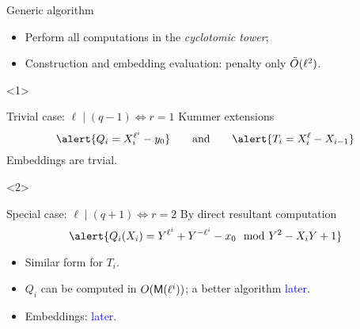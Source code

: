 \documentclass[12pt]{beamer}
\begin{document}

\begin{frame}
  \frametitle{\insertsection }

  \begin{exampleblock}{Generic algorithm}
    \begin{itemize}
    \item Perform all computations in the \emph{cyclotomic tower};
    \item Construction and embedding evaluation: penalty only \alert{$\tilde{O}(\ell^2)$}.
    \end{itemize}
  \end{exampleblock}

  \begin{overlayarea}{\textwidth}{5cm}
    \begin{onlyenv}<1>
      \begin{exampleblock}{Trivial case: $\ell \mid (q-1) \Leftrightarrow r=1$}
        Kummer extensions
        \[\alert{Q_i=X_i^{\ell^i}-y_0} \qquad\text{and}\qquad \alert{T_i=X_{i}^\ell-X_{i-1}}\]
        Embeddings are trvial.
      \end{exampleblock}
    \end{onlyenv}	

    \begin{onlyenv}<2>
      \begin{exampleblock}{Special case: $\ell \mid (q + 1) \Leftrightarrow r = 2$}
        By direct resultant computation
        \[\alert{Q_i(X_i) = Y^{\ell^i} + Y^{-\ell^i} - x_0 \mod Y^2-X_iY+1}\]

        \vspace*{-3mm}
        \begin{itemize}
        \item Similar form for $T_i$.
        \item $Q_i$ can be computed in $O(\mathsf{M}(\ell^i))$; a better algorithm \textcolor{blue}{later}.
        \item Embeddings: \textcolor{blue}{later}.
        \end{itemize}
      \end{exampleblock}
    \end{onlyenv}	
  \end{overlayarea}
\end{frame}


\end{document}
